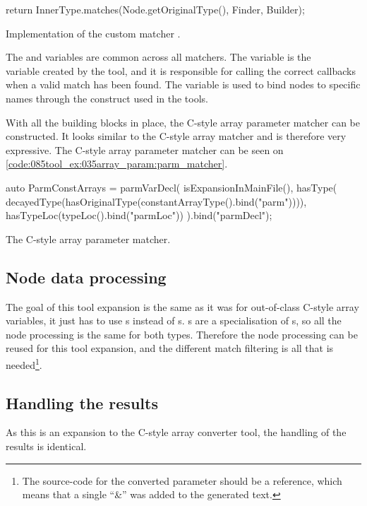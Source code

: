 \begin{listing}[H]
    \begin{cppcode}
return InnerType.matches(Node.getOriginalType(), Finder, Builder);
    \end{cppcode}
    \caption{Implementation of the custom matcher .}
    \label{code:085tool_ex:035array_param:match_impl}
\end{listing}

The  and  variables are common across all matchers. The  variable is the\\
 variable created by the tool, and it is responsible for calling the correct callbacks when a valid match has been found. The  variable is used to bind nodes to specific names through the  construct used in the tools.

With all the building blocks in place, the C-style array parameter matcher can be constructed. It looks similar to the C-style array matcher and is therefore very expressive. The C-style array parameter matcher can be seen on \cref{code:085tool_ex:035array_param:parm_matcher}.

\begin{listing}[H]
    \begin{cppcode}
auto ParmConstArrays = parmVarDecl(
        isExpansionInMainFile(),
        hasType(
            decayedType(hasOriginalType(constantArrayType().bind("parm")))),
        hasTypeLoc(typeLoc().bind("parmLoc")) 
    ).bind("parmDecl");
    \end{cppcode}
    \caption{The C-style array parameter matcher.}
    \label{code:085tool_ex:035array_param:parm_matcher}
\end{listing}

\subsection{Node data processing}

The goal of this tool expansion is the same as it was for out-of-class C-style array variables, it just has to use s instead of s. s are a specialisation of s, so all the node processing is the same for both types. Therefore the node processing can be reused for this tool expansion, and the different match filtering is all that is needed\footnote{The source-code for the converted  parameter should be a reference, which means that a single ``\&'' was added to the generated text.}.

\subsection{Handling the results}

As this is an expansion to the C-style array converter tool, the handling of the results is identical.